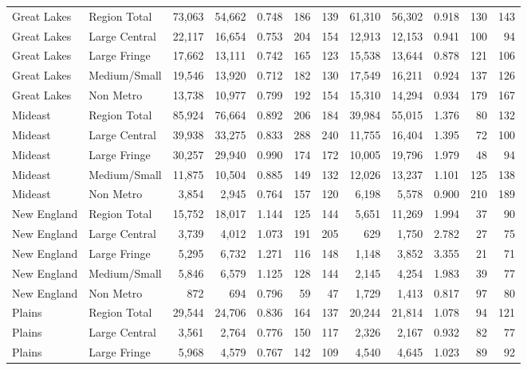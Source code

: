\documentclass[
]{article}
\begin{document}
\begin{table}
\begin{tabular}[t]{llrrrrrrrrrr}
\addlinespace[5pt]
Great Lakes & Region Total & 73,063 & 54,662 & 0.748 & 186 & 139 & 61,310 & 56,302 & 0.918 & 130 & 143\\
\addlinespace[2pt]
Great Lakes & Large Central & 22,117 & 16,654 & 0.753 & 204 & 154 & 12,913 & 12,153 & 0.941 & 100 & 94\\
Great Lakes & Large Fringe & 17,662 & 13,111 & 0.742 & 165 & 123 & 15,538 & 13,644 & 0.878 & 121 & 106\\
Great Lakes & Medium/Small & 19,546 & 13,920 & 0.712 & 182 & 130 & 17,549 & 16,211 & 0.924 & 137 & 126\\
Great Lakes & Non Metro & 13,738 & 10,977 & 0.799 & 192 & 154 & 15,310 & 14,294 & 0.934 & 179 & 167\\
\addlinespace[5pt]
Mideast & Region Total & 85,924 & 76,664 & 0.892 & 206 & 184 & 39,984 & 55,015 & 1.376 & 80 & 132\\
\addlinespace[2pt]
Mideast & Large Central & 39,938 & 33,275 & 0.833 & 288 & 240 & 11,755 & 16,404 & 1.395 & 72 & 100\\
Mideast & Large Fringe & 30,257 & 29,940 & 0.990 & 174 & 172 & 10,005 & 19,796 & 1.979 & 48 & 94\\
Mideast & Medium/Small & 11,875 & 10,504 & 0.885 & 149 & 132 & 12,026 & 13,237 & 1.101 & 125 & 138\\
Mideast & Non Metro & 3,854 & 2,945 & 0.764 & 157 & 120 & 6,198 & 5,578 & 0.900 & 210 & 189\\
\addlinespace[5pt]
New England & Region Total & 15,752 & 18,017 & 1.144 & 125 & 144 & 5,651 & 11,269 & 1.994 & 37 & 90\\
\addlinespace[2pt]
New England & Large Central & 3,739 & 4,012 & 1.073 & 191 & 205 & 629 & 1,750 & 2.782 & 27 & 75\\
New England & Large Fringe & 5,295 & 6,732 & 1.271 & 116 & 148 & 1,148 & 3,852 & 3.355 & 21 & 71\\
New England & Medium/Small & 5,846 & 6,579 & 1.125 & 128 & 144 & 2,145 & 4,254 & 1.983 & 39 & 77\\
New England & Non Metro & 872 & 694 & 0.796 & 59 & 47 & 1,729 & 1,413 & 0.817 & 97 & 80\\
\addlinespace[5pt]
Plains & Region Total & 29,544 & 24,706 & 0.836 & 164 & 137 & 20,244 & 21,814 & 1.078 & 94 & 121\\
\addlinespace[2pt]
Plains & Large Central & 3,561 & 2,764 & 0.776 & 150 & 117 & 2,326 & 2,167 & 0.932 & 82 & 77\\
Plains & Large Fringe & 5,968 & 4,579 & 0.767 & 142 & 109 & 4,540 & 4,645 & 1.023 & 89 & 92\\

\end{tabular}
\end{table}
\end{document}
